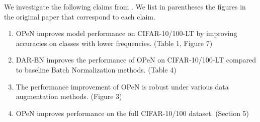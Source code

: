 





We investigate the following claims from \citet{PureNoise}. We list in parentheses the figures in the original paper that correspond to each claim.

\begin{enumerate}
    \item OPeN improves model performance on CIFAR-10/100-LT by improving accuracies on classes with lower frequencies. (Table 1, Figure 7)
    \item DAR-BN improves the performance of OPeN on CIFAR-10/100-LT compared to baseline Batch Normalization methods. (Table 4)
    \item The performance improvement of OPeN is robust under various data augmentation methods. (Figure 3)
    \item OPeN improves performance on the full CIFAR-10/100 dataset. (Section 5)
\end{enumerate}

